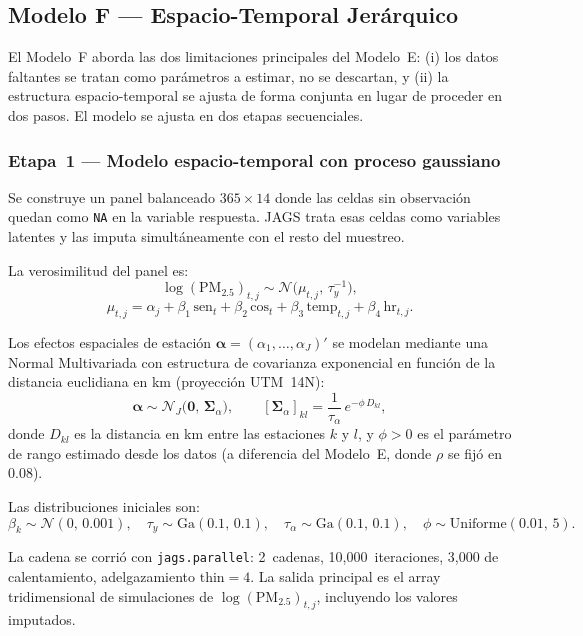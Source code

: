 ﻿\documentclass[12pt]{article}
\begin{document}
\subsection{Modelo F --- Espacio-Temporal Jer\'arquico}

El Modelo~F aborda las dos limitaciones principales del Modelo~E:
(i) los datos faltantes se tratan como par\'ametros a estimar, no se
descartan, y (ii) la estructura espacio-temporal se ajusta de forma
conjunta en lugar de proceder en dos pasos.
El modelo se ajusta en dos etapas secuenciales.

\subsubsection*{Etapa~1 --- Modelo espacio-temporal con proceso gaussiano}

Se construye un panel balanceado $365 \times 14$ donde las celdas
sin observaci\'on quedan como \texttt{NA} en la variable respuesta.
JAGS trata esas celdas como variables latentes y las imputa
simult\'aneamente con el resto del muestreo.

La verosimilitud del panel es:
\[
  \log(\text{PM}_{2.5})_{t,j} \sim \mathcal{N}\!\bigl(\mu_{t,j},\,\tau_y^{-1}\bigr),
\]
\[
  \mu_{t,j} = \alpha_j + \beta_1\,\text{sen}_t + \beta_2\,\text{cos}_t
              + \beta_3\,\text{temp}_{t,j} + \beta_4\,\text{hr}_{t,j}.
\]

Los efectos espaciales de estaci\'on $\boldsymbol\alpha = (\alpha_1,\ldots,\alpha_J)'$
se modelan mediante una Normal Multivariada con estructura de covarianza
exponencial en funci\'on de la distancia euclidiana en km (proyecci\'on UTM~14N):
\[
  \boldsymbol\alpha \sim \mathcal{N}_J\!\bigl(\mathbf{0},\,
  \boldsymbol\Sigma_\alpha\bigr), \qquad
  [\boldsymbol\Sigma_\alpha]_{kl} = \frac{1}{\tau_\alpha}\,e^{-\phi\, D_{kl}},
\]
donde $D_{kl}$ es la distancia en km entre las estaciones $k$ y $l$,
y $\phi > 0$ es el par\'ametro de rango estimado desde los datos
(a diferencia del Modelo~E, donde $\rho$ se fij\'o en 0.08\textdegree).

Las distribuciones iniciales son:
\[
  \beta_k \sim \mathcal{N}(0,\,0.001), \quad
  \tau_y \sim \text{Ga}(0.1,\,0.1), \quad
  \tau_\alpha \sim \text{Ga}(0.1,\,0.1), \quad
  \phi \sim \text{Uniforme}(0.01,\,5).
\]

La cadena se corri\'o con \texttt{jags.parallel}: 2~cadenas,
10{,}000~iteraciones, 3{,}000 de calentamiento, adelgazamiento $\text{thin}=4$.
La salida principal es el array tridimensional de simulaciones de
$\log(\text{PM}_{2.5})_{t,j}$, incluyendo los valores imputados.
\end{document}
